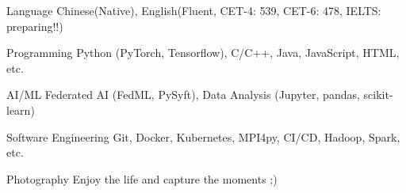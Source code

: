 

\begin{cvskills}

\cvskill
{Language} %
{Chinese(Native), English(Fluent, CET-4: 539, CET-6: 478, IELTS: preparing!!)} %

\cvskill
{Programming} %
{Python (PyTorch, Tensorflow), C/C++, Java, JavaScript, HTML, etc.} %

\cvskill
{AI/ML} %
{Federated AI (FedML, PySyft), Data Analysis (Jupyter, pandas, scikit-learn)} %

\cvskill
{Software Engineering} %
{Git, Docker, Kubernetes, MPI4py, CI/CD, Hadoop, Spark, etc.} %

\cvskill
{Photography} %
{Enjoy the life and capture the moments ;)} %


\end{cvskills}
